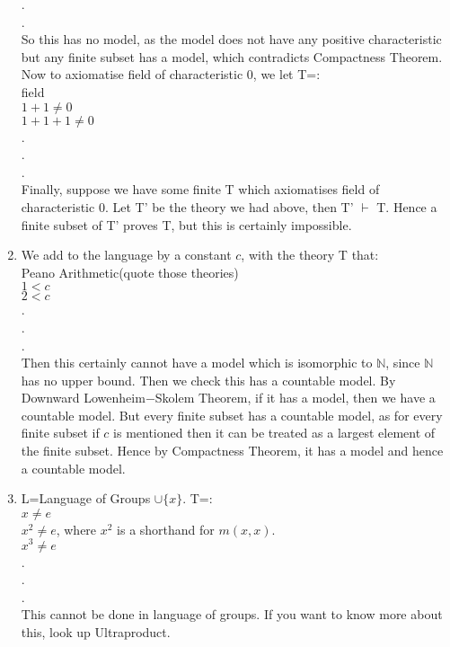\begin{enumerate}
      .\\
      .\\
      So this has no model, as the model does not have any positive characteristic but any finite subset has a model, which contradicts Compactness Theorem.\\
      Now to axiomatise field of characteristic $0$, we let T=:\\
      field\\
      $1+1 \neq 0$\\
      $1+1+1 \neq 0$\\
      .\\
      .\\
      .\\
      Finally, suppose we have some finite T which axiomatises field of characteristic $0$. Let T' be the theory we had above, then T' $\vdash$ T. Hence a finite subset of T' proves T, but this is certainly impossible.\\
\item We add to the language by a constant $c$, with the theory T that:\\
      Peano Arithmetic(quote those theories)\\
      $1<c$\\
      $2<c$\\
      .\\
      .\\
      .\\
      Then this certainly cannot have a model which is isomorphic to $\mathbb{N}$, since $\mathbb{N}$ has no upper bound. Then we check this has a countable model. By Downward Lowenheim$-$Skolem Theorem, if it has a model, then we have a countable model. But every finite subset has a countable model, as for every finite subset if $c$ is mentioned then it can be treated as a largest element of the finite subset. Hence by Compactness Theorem, it has a model and hence a countable model.\\
\item L=Language of Groups $\cup \{x\}$. T=:\\
      $x \neq e$\\
      $x^2 \neq e$, where $x^2$ is a shorthand for $m(x,x)$.\\
      $x^3 \neq e$\\
      .\\
      .\\
      .\\
      This cannot be done in language of groups. If you want to know more about this, look up Ultraproduct.\\

\end{enumerate}
